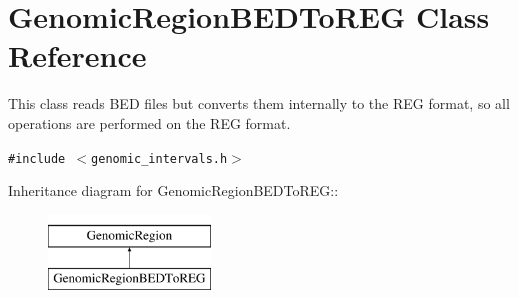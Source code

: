 \hypertarget{classGenomicRegionBEDToREG}{
\section{GenomicRegionBEDToREG Class Reference}
\label{classGenomicRegionBEDToREG}
}
This class reads BED files but converts them internally to the REG format, so all operations are performed on the REG format.  


{\tt \#include $<$genomic\_\-intervals.h$>$}

Inheritance diagram for GenomicRegionBEDToREG::\begin{figure}[H]
\begin{center}
\leavevmode
\includegraphics[height=2cm]{classGenomicRegionBEDToREG}
\end{center}
\end{figure}
